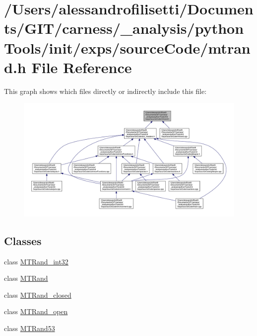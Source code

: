 \hypertarget{a00072}{\section{/\+Users/alessandrofilisetti/\+Documents/\+G\+I\+T/carness/\+\_\+analysis/python\+Tools/init/exps/source\+Code/mtrand.h File Reference}
\label{a00072}
}
This graph shows which files directly or indirectly include this file\+:\nopagebreak
\begin{figure}[H]
\begin{center}
\leavevmode
\includegraphics[width=350pt]{a00194}
\end{center}
\end{figure}
\subsection*{Classes}
\begin{DoxyCompactItemize}
\item 
class \hyperlink{a00018}{M\+T\+Rand\+\_\+int32}
\item 
class \hyperlink{a00015}{M\+T\+Rand}
\item 
class \hyperlink{a00017}{M\+T\+Rand\+\_\+closed}
\item 
class \hyperlink{a00019}{M\+T\+Rand\+\_\+open}
\item 
class \hyperlink{a00016}{M\+T\+Rand53}
\end{DoxyCompactItemize}
